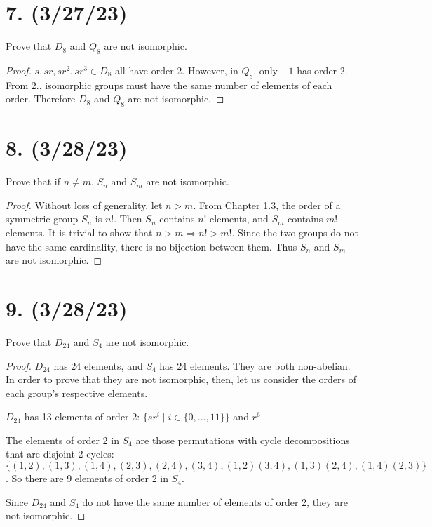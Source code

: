\documentclass{article}
\begin{document}
\section*{7. (3/27/23)}

Prove that $D_8$ and $Q_8$ are not isomorphic.

\begin{proof}
    $s, sr, sr^2, sr^3 \in D_8$ all have order 2. However, in $Q_8$, only $-1$ has order 2. From 2., isomorphic groups must have the same number of elements of each order. Therefore $D_8$ and $Q_8$ are not isomorphic.
\end{proof}

\section*{8. (3/28/23)}

Prove that if $n \neq m$, $S_n$ and $S_m$ are not isomorphic.

\begin{proof}
    Without loss of generality, let $n > m$. From Chapter 1.3, the order of a symmetric group $S_n$ is $n!$. Then $S_n$ contains $n!$ elements, and $S_m$ contains $m!$ elements. It is trivial to show that $n > m \Rightarrow n! > m!$. Since the two groups do not have the same cardinality, there is no bijection between them. Thus $S_n$ and $S_m$ are not isomorphic.
\end{proof}

\section*{9. (3/28/23)}

Prove that $D_{24}$ and $S_4$ are not isomorphic.

\begin{proof}
    $D_{24}$ has 24 elements, and $S_4$ has 24 elements. They are both non-abelian. In order to prove that they are not isomorphic, then, let us consider the orders of each group's respective elements.

    $D_{24}$ has 13 elements of order 2: $\{ sr^i \mid i \in \{0, ..., 11\} \}$ and $r^6$.

    The elements of order 2 in $S_4$ are those permutations with cycle decompositions that are disjoint 2-cycles: \newline
    $\{ (1,2), (1,3), (1,4), (2,3), (2,4), (3,4), (1,2)(3,4), (1,3)(2,4), (1,4)(2,3) \}$. So \newline
    there are 9 elements of order 2 in $S_4$.

    Since $D_{24}$ and $S_4$ do not have the same number of elements of order 2, they are not isomorphic.
\end{proof}
\end{document}

